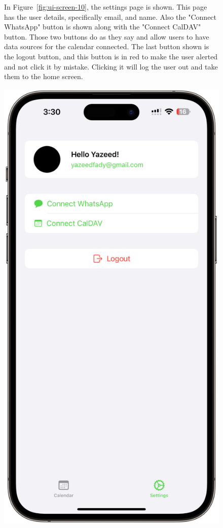 \clearpage

\begin{figure}[!h]
    \begin{minipage}{0.65\textwidth}
        In Figure~\ref{fig:ui-screen-10}, the settings page is shown. This page has the user details, specifically email, and name. Also the "Connect WhatsApp" button is shown along with the "Connect CalDAV" button. Those two buttons do as they say and allow users to have data sources for the calendar connected. The last button shown is the logout button, and this button is in red to make the user alerted and not click it by mistake. Clicking it will log the user out and take them to the home screen.
    \end{minipage}
    \hfill
    \begin{minipage}{0.3\textwidth}
        \centering
        \includegraphics[width=\textwidth]{images/screen10.png}

\end{minipage}
\end{figure}
